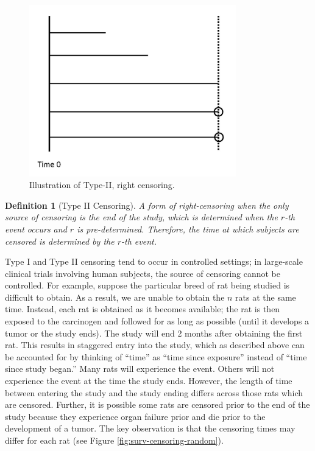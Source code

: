 \documentclass[
]{book}
\theoremstyle{plain}
\theoremstyle{mydefn}
\newtheorem{definition}{Definition}[chapter]
\theoremstyle{myexmpl}
\theoremstyle{remark}
\begin{document}
\begin{figure}

{\centering \includegraphics[width=0.8\textwidth]{images/censoring-type-2} 

}

\caption{Illustration of Type-II, right censoring.}\label{fig:surv-censoring-type-2}
\end{figure}

\begin{definition}[Type II Censoring]
\protect\hypertarget{def:defn-type-II}{}{\label{def:defn-type-II} {} }A form of right-censoring when the only source of censoring is the end of the study, which is determined when the \(r\)-th event occurs and \(r\) is pre-determined. Therefore, the time at which subjects are censored is determined by the \(r\)-th event.
\end{definition}

Type I and Type II censoring tend to occur in controlled settings; in large-scale clinical trials involving human subjects, the source of censoring cannot be controlled. For example, suppose the particular breed of rat being studied is difficult to obtain. As a result, we are unable to obtain the \(n\) rats at the same time. Instead, each rat is obtained as it becomes available; the rat is then exposed to the carcinogen and followed for as long as possible (until it develops a tumor or the study ends). The study will end 2 months after obtaining the first rat. This results in staggered entry into the study, which as described above can be accounted for by thinking of ``time'' as ``time since exposure'' instead of ``time since study began.'' Many rats will experience the event. Others will not experience the event at the time the study ends. However, the length of time between entering the study and the study ending differs across those rats which are censored. Further, it is possible some rats are censored prior to the end of the study because they experience organ failure prior and die prior to the development of a tumor. The key observation is that the censoring times may differ for each rat (see Figure \ref{fig:surv-censoring-random}).
\end{document}
